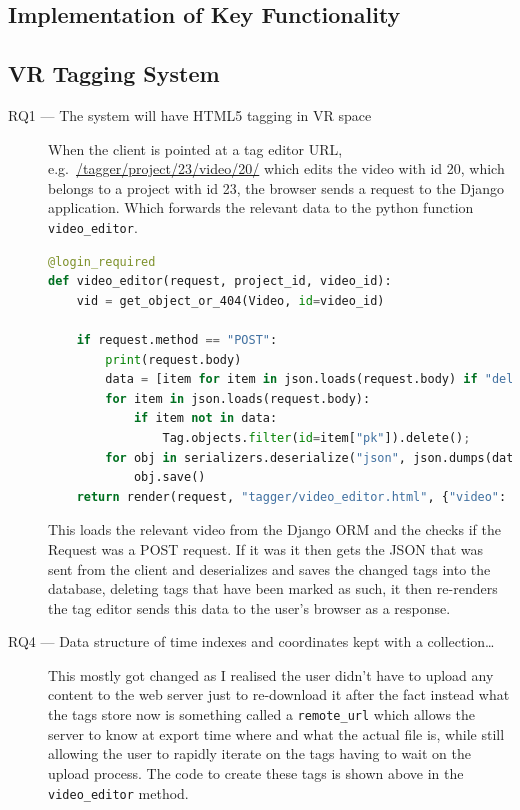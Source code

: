 \documentclass[12pt]{report}
\newcommand{\inlinecode}{\texttt}
\begin{document}
\subsection{Implementation of Key Functionality}
\subsection{VR Tagging System}

\begin{description}
    \item[RQ1 --- The system will have HTML5 tagging in VR space]
When the client is pointed at a tag editor URL, e.g.\ \url{/tagger/project/23/video/20/} which edits the video with id 20, which belongs to a project with id 23, the browser sends a request to the Django application. Which forwards the relevant data to the python function \inlinecode{video\_editor}.
        \begin{lstlisting}[language=Python, breaklines=true]
@login_required
def video_editor(request, project_id, video_id):
    vid = get_object_or_404(Video, id=video_id)

    if request.method == "POST":
        print(request.body)
        data = [item for item in json.loads(request.body) if "deleted" not in item]
        for item in json.loads(request.body):
            if item not in data:
                Tag.objects.filter(id=item["pk"]).delete();
        for obj in serializers.deserialize("json", json.dumps(data)):
            obj.save()
    return render(request, "tagger/video_editor.html", {"video": vid, "tags": vid.tag_set, "tags_json": serializers.serialize("json", vid.tag_set.all())})
        \end{lstlisting}
 This loads the relevant video from the Django ORM and the checks if the Request was a POST request. If it was it then gets the JSON that was sent from the client and deserializes and saves the changed tags into the database, deleting tags that have been marked as such, it then re-renders the tag editor sends this data to the user's browser as a response. 

    \item[RQ4 --- Data structure of time indexes and coordinates kept with a
        collection\ldots]
 This mostly got changed as I realised the user didn't have to upload any content to the web server just to re-download it after the fact instead what the tags store now is something called a \inlinecode{remote\_url} which allows the server to know at export time where and what the actual file is, while still allowing the user to rapidly iterate on the tags having to wait on the upload process. The code to create these tags is shown above in the \inlinecode{video\_editor} method. 


\end{description}
\end{document}
